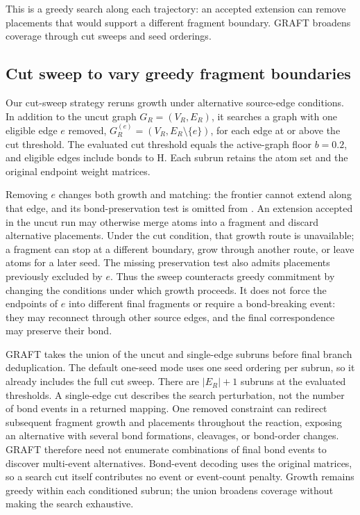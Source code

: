 This is a greedy search along each trajectory: an accepted extension can remove placements that would support a different fragment boundary. GRAFT broadens coverage through cut sweeps and seed orderings.

\subsection{Cut sweep to vary greedy fragment boundaries}
\label{sec:cut-sweep}

Our cut-sweep strategy reruns growth under alternative source-edge conditions. In addition to the uncut graph $G_R=(V_R,E_R)$, it searches a graph with one eligible edge $e$ removed, $G_R^{(e)}=(V_R,E_R\setminus\{e\})$, for each edge at or above the cut threshold. The evaluated cut threshold equals the active-graph floor $b=0.2$, and eligible edges include bonds to H. Each subrun retains the atom set and the original endpoint weight matrices.

Removing $e$ changes both growth and matching: the frontier cannot extend along that edge, and its bond-preservation test is omitted from . An extension accepted in the uncut run may otherwise merge atoms into a fragment and discard alternative placements. Under the cut condition, that growth route is unavailable; a fragment can stop at a different boundary, grow through another route, or leave atoms for a later seed. The missing preservation test also admits placements previously excluded by $e$. Thus the sweep counteracts greedy commitment by changing the conditions under which growth proceeds. It does not force the endpoints of $e$ into different final fragments or require a bond-breaking event: they may reconnect through other source edges, and the final correspondence may preserve their bond.

GRAFT takes the union of the uncut and single-edge subruns before final branch deduplication. The default one-seed mode uses one seed ordering per subrun, so it already includes the full cut sweep. There are $|E_R|+1$ subruns at the evaluated thresholds. A single-edge cut describes the search perturbation, not the number of bond events in a returned mapping. One removed constraint can redirect subsequent fragment growth and placements throughout the reaction, exposing an alternative with several bond formations, cleavages, or bond-order changes. GRAFT therefore need not enumerate combinations of final bond events to discover multi-event alternatives. Bond-event decoding uses the original matrices, so a search cut itself contributes no event or event-count penalty. Growth remains greedy within each conditioned subrun; the union broadens coverage without making the search exhaustive.

